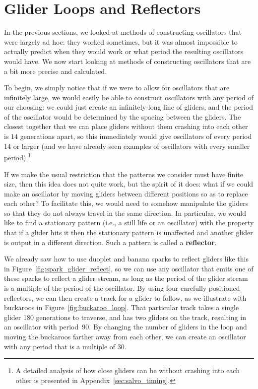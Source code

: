\section{Glider Loops and Reflectors}\label{sec:glider_loops}

In the previous sections, we looked at methods of constructing oscillators that were largely ad hoc: they worked sometimes, but it was almost impossible to actually predict when they would work or what period the resulting oscillators would have. We now start looking at methods of constructing oscillators that are a bit more precise and calculated.

To begin, we simply notice that if we were to allow for oscillators that are infinitely large, we would easily be able to construct oscillators with any period of our choosing: we could just create an infinitely-long line of gliders, and the period of the oscillator would be determined by the spacing between the gliders. The closest together that we can place gliders without them crashing into each other is $14$ generations apart, so this immediately would give oscillators of every period 14 or larger (and we have already seen examples of oscillators with every smaller period).\footnote{A detailed analysis of how close gliders can be without crashing into each other is presented in Appendix~\ref{sec:salvo_timing}.}

If we make the usual restriction that the patterns we consider must have finite size, then this idea does not quite work, but the spirit of it does: what if we could make an oscillator by moving gliders between different positions so as to replace each other? To facilitate this, we would need to somehow manipulate the gliders so that they do not always travel in the same direction. In particular, we would like to find a stationary pattern (i.e., a still life or an oscillator) with the property that if a glider hits it then the stationary pattern is unaffected and another glider is output in a different direction. Such a pattern is called a \textbf{reflector}.

We already saw how to use duoplet and banana sparks to reflect gliders like this in Figure~\ref{fig:spark_glider_reflect}, so we can use any oscillator that emits one of these sparks to reflect a glider stream, as long as the period of the glider stream is a multiple of the period of the oscillator. By using four carefully-positioned reflectors, we can then create a track for a glider to follow, as we illustrate with buckaroos in Figure~\ref{fig:buckaroo_loop}. That particular track takes a single glider 180 generations to traverse, and has two gliders on the track, resulting in an oscillator with period~$90$. By changing the number of gliders in the loop and moving the buckaroos farther away from each other, we can create an oscillator with any period that is a multiple of $30$.

